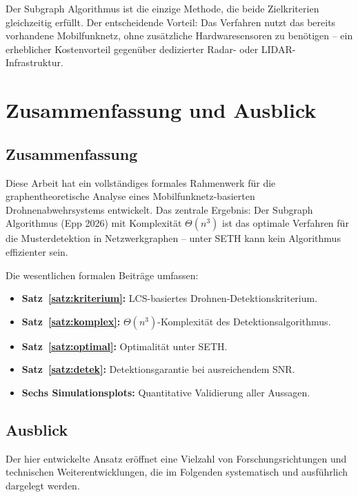 ﻿\documentclass[a4paper,12pt]{article}
\theoremstyle{definition}
\begin{document}
Der Subgraph Algorithmus ist die einzige Methode, die beide Zielkriterien
gleichzeitig erf\"ullt. Der entscheidende Vorteil: Das Verfahren nutzt das
bereits vorhandene Mobilfunknetz, ohne zus\"atzliche Hardwaresensoren zu
ben\"otigen -- ein erheblicher Kostenvorteil gegen\"uber dedizierter Radar-
oder LIDAR-Infrastruktur.

\section{Zusammenfassung und Ausblick}
\label{sec:zusammenfassung}

\subsection{Zusammenfassung}

Diese Arbeit hat ein vollst\"andiges formales Rahmenwerk f\"ur die graphentheoretische
Analyse eines Mobilfunknetz-basierten Drohnenabwehrsystems entwickelt. Das
zentrale Ergebnis: Der Subgraph Algorithmus (Epp 2026) mit Komplexit\"at
$\Theta(n^3)$ ist das optimale Verfahren f\"ur die Musterdetektion in
Netzwerkgraphen -- unter SETH kann kein Algorithmus effizienter sein.

Die wesentlichen formalen Beitr\"age umfassen:

\begin{itemize}
    \item \textbf{Satz~\ref{satz:kriterium}:} LCS-basiertes Drohnen-Detektionskriterium.
    \item \textbf{Satz~\ref{satz:komplex}:} $\Theta(n^3)$-Komplexit\"at des Detektionsalgorithmus.
    \item \textbf{Satz~\ref{satz:optimal}:} Optimalit\"at unter SETH.
    \item \textbf{Satz~\ref{satz:detek}:} Detektionsgarantie bei ausreichendem SNR.
    \item \textbf{Sechs Simulationsplots:} Quantitative Validierung aller Aussagen.
\end{itemize}

\subsection{Ausblick}

Der hier entwickelte Ansatz er\"offnet eine Vielzahl von Forschungsrichtungen und
technischen Weiterentwicklungen, die im Folgenden systematisch und ausf\"uhrlich
dargelegt werden.
\end{document}
